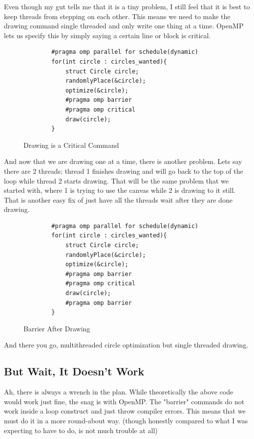 \documentclass[12pt]{article}
\begin{document}
Even though my gut tells me that it is a tiny problem, I still feel that it is best to keep threads from stepping on each other.
This means we need to make the drawing command single threaded and only write one thing at a time.
OpenMP lets us specify this by simply saying a certain line or block is critical.

\begin{figure}[htb]
	\centering
	\begin{verbatim}
		#pragma omp parallel for schedule(dynamic)
		for(int circle : circles_wanted){
			struct Circle circle;
			randomlyPlace(&circle);
			optimize(&circle);
			#pragma omp barrier
			#pragma omp critical
			draw(circle);
		}
	\end{verbatim}
	\caption{Drawing is a Critical Command}
\end{figure}

And now that we are drawing one at a time, there is another problem.
Lets say there are 2 threads; thread 1 finishes drawing and will go back to the top of the loop while thread 2 starts drawing.
That will be the same problem that we started with, where 1 is trying to use the canvas while 2 is drawing to it still.
That is another easy fix of just have all the threads wait after they are done drawing.

\begin{figure}[htb]
	\centering
	\begin{verbatim}
		#pragma omp parallel for schedule(dynamic)
		for(int circle : circles_wanted){
			struct Circle circle;
			randomlyPlace(&circle);
			optimize(&circle);
			#pragma omp barrier
			#pragma omp critical
			draw(circle);
			#pragma omp barrier
		}
	\end{verbatim}
	\caption{Barrier After Drawing}
\end{figure}

And there you go, multithreaded circle optimization but single threaded drawing.

\subsection{But Wait, It Doesn't Work}

Ah, there is always a wrench in the plan.
While theoretically the above code would work just fine, the snag is with OpenMP.
The "barrier" commands do not work inside a loop construct and just throw compiler errors.
This means that we must do it in a more round-about way.
(though honestly compared to what I was expecting to have to do, is not much trouble at all)
\end{document}
